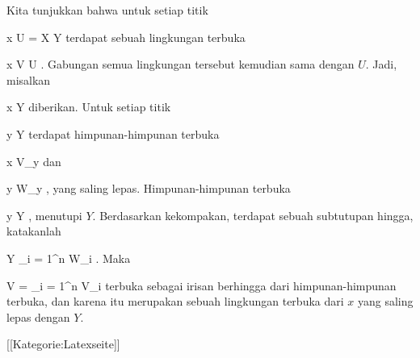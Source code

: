 Kita tunjukkan bahwa untuk setiap titik

\mavergleichskette
{\vergleichskette
{ x
}
{ \in }{ U
}
{ = }{ X \setminus Y
}
{    }{
}
{   }{
}
}
{}{}{}
terdapat sebuah lingkungan terbuka

\mavergleichskette
{\vergleichskette
{ x
}
{ \in }{ V
}
{ \subseteq }{ U
}
{    }{
}
{   }{
}
}
{}{}{}.
Gabungan semua lingkungan tersebut kemudian sama dengan $U$. Jadi, misalkan

\mavergleichskette
{\vergleichskette
{ x
}
{ \notin }{ Y
}
{  }{
}
{    }{
}
{   }{
}
}
{}{}{}
diberikan. Untuk setiap titik

\mavergleichskette
{\vergleichskette
{ y
}
{ \in }{ Y
}
{  }{
}
{    }{
}
{   }{
}
}
{}{}{}
terdapat himpunan-himpunan terbuka

\mavergleichskette
{\vergleichskette
{ x
}
{ \in }{ V_y
}
{  }{
}
{    }{
}
{   }{
}
}
{}{}{}
dan

\mavergleichskette
{\vergleichskette
{ y
}
{ \in }{ W_y
}
{  }{
}
{    }{
}
{   }{
}
}
{}{}{,}
yang saling lepas. Himpunan-himpunan terbuka

 {}
 {y \in Y} {}
 {} {} {} {,}
menutupi $Y$. Berdasarkan kekompakan, terdapat sebuah subtutupan hingga, katakanlah

\mavergleichskettedisp
{\vergleichskette
{ Y
}
{ \subseteq} { \bigcup_{i = 1}^n  W_i
}
{ } {
}
{ } {
}
{ } {
}
}
{}{}{.}
Maka

\mavergleichskette
{\vergleichskette
{ V
}
{ = }{ \bigcap_{i = 1}^n  V_i
}
{  }{
}
{    }{
}
{   }{
}
}
{}{}{}
terbuka sebagai irisan berhingga dari himpunan-himpunan terbuka, dan karena itu merupakan sebuah lingkungan terbuka dari $x$ yang saling lepas dengan $Y$.

 [[Kategorie:Latexseite]]
